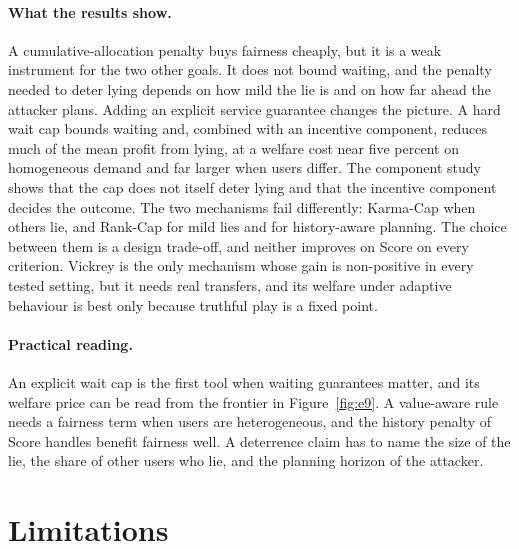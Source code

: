 \documentclass{article}
\theoremstyle{plain}
\theoremstyle{definition}
\begin{document}
\paragraph{What the results show.}
A cumulative-allocation penalty buys fairness cheaply, but it is a weak instrument for the two other goals.
It does not bound waiting, and the penalty needed to deter lying depends on how mild the lie is and on how far ahead the attacker plans.
Adding an explicit service guarantee changes the picture.
A hard wait cap bounds waiting and, combined with an incentive component, reduces much of the mean profit from lying, at a welfare cost near five percent on homogeneous demand and far larger when users differ.
The component study shows that the cap does not itself deter lying and that the incentive component decides the outcome.
The two mechanisms fail differently: Karma-Cap when others lie, and Rank-Cap for mild lies and for history-aware planning.
The choice between them is a design trade-off, and neither improves on Score on every criterion.
Vickrey is the only mechanism whose gain is non-positive in every tested setting, but it needs real transfers, and its welfare under adaptive behaviour is best only because truthful play is a fixed point.

\paragraph{Practical reading.}
An explicit wait cap is the first tool when waiting guarantees matter, and its welfare price can be read from the frontier in Figure~\ref{fig:e9}.
A value-aware rule needs a fairness term when users are heterogeneous, and the history penalty of Score handles benefit fairness well.
A deterrence claim has to name the size of the lie, the share of other users who lie, and the planning horizon of the attacker.

\section{Limitations}
\label{sec:limits}
\end{document}

